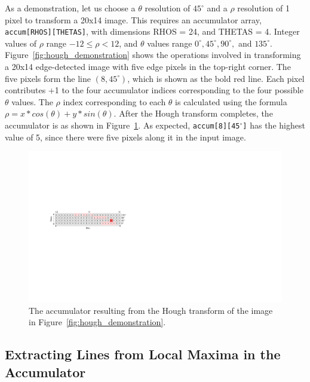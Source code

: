 \documentclass[epsfig,10pt,fullpage]{article}
\begin{document}
As a demonstration, let us choose a $\theta$ resolution of $45^\circ$ and a $\rho$ resolution of 1 pixel to 
transform a 20x14 image. This requires an accumulator array, \texttt{accum[RHOS][THETAS]}, with dimensions 
RHOS = 24, and THETAS = 4. Integer values of $\rho$ range $-12 \leq \rho < 12$, 
and $\theta$ values range $0^\circ, 45^\circ, 90^\circ,$ and $135^\circ$. 
Figure~\ref{fig:hough_demonstration} shows the operations involved in 
transforming a 20x14 edge-detected image with five edge pixels in the top-right corner. 
The five pixels form the line $(8, 45^\circ)$, which is shown as the bold red line.
Each pixel contributes +1 to the four accumulator indices corresponding to the four possible $\theta$ values.
The $\rho$ index corresponding to each $\theta$ is calculated using the formula $\rho = x*cos(\theta) + y*sin(\theta)$.
After the Hough transform completes, the accumulator is as shown in Figure~\ref{fig:accumulator}. As
expected, \texttt{accum[8][45$^\circ$]} has the highest value of 5, since there were five pixels along it in the input image.


\begin{figure}[H]
   \begin{center}
       \includegraphics[scale = 0.8]{figures/fig_accumulator}
   \end{center}
   \caption{The accumulator resulting from the Hough transform of the image in Figure~\ref{fig:hough_demonstration}.}
	\label{fig:accumulator}
\end{figure}


\subsection*{Extracting Lines from Local Maxima in the Accumulator}
\end{document}
